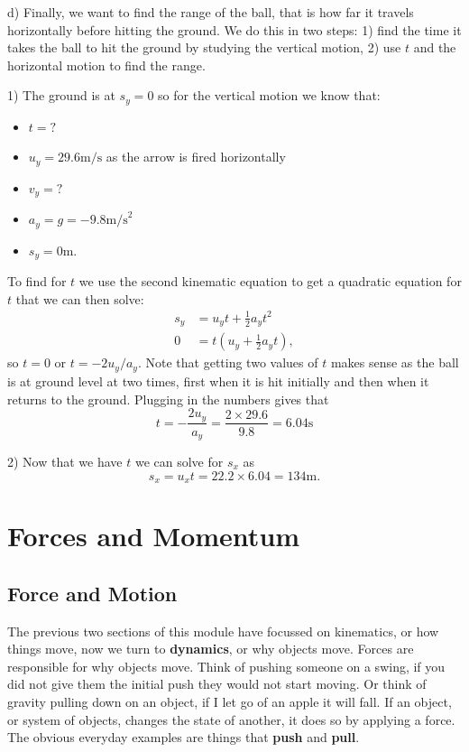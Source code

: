 \documentclass[a4paper,12pt]{book}
\begin{document}
d) Finally, we want to find the range of the ball, that is how far it travels horizontally before hitting the ground. We do this in two steps: 1) find the time it takes the ball to hit the ground by studying the vertical motion, 2) use $t$ and the horizontal motion to find the range.

1) The ground is at $s_{y}=0$ so for the vertical motion we know that:
\begin{itemize}
\setlength{\itemsep}{-5pt}
    \item $t=?$
\item $u_{y}=29.6\text{m/s}$ as the arrow is fired horizontally
\item $v_{y}=?$
\item $a_{y}=g=-9.8\text{m/s}^{2}$
\item $s_{y}=0$m.
\end{itemize}
To find for $t$ we use the second kinematic equation to get a quadratic equation for $t$ that we can then solve:
\begin{align*}
s_{y}&=u_{y}t+\frac{1}{2}a_{y}t^{2}\\
0&=t\left(u_{y}+\frac{1}{2}a_{y}t\right),
\end{align*}
so $t=0$ or $t=-2u_{y}/a_{y}$. Note that getting two values of $t$ makes sense as the ball is at ground level at two times, first when it is hit initially and then when it returns to the ground.  Plugging in the numbers gives that
\begin{equation*}
t=-\frac{2u_{y}}{a_{y}}=\frac{2\times 29.6}{9.8}=6.04\text{s}
\end{equation*}

2) Now that we have $t$ we can solve for $s_{x}$ as
\begin{equation*}
s_{x}=u_{x}t=22.2\times 6.04 =134\text{m}.
\end{equation*}


\chapter{Forces and Momentum}
\section{Force and Motion}
The previous two sections of this module have focussed on kinematics, or how things move, now we turn to \textbf{dynamics}, or why objects move.  Forces are responsible for why objects move. Think of pushing someone on a swing, if you did not give them the initial push they would not start moving. Or think of gravity pulling down on an object, if I let go of an apple it will fall. If an object, or system of objects, changes the state of another, it does so by applying a force. The obvious everyday examples are things that \textbf{push} and \textbf{pull}. \\
\end{document}

